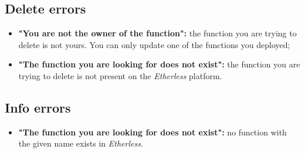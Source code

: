   \subsection{Delete errors}
  \begin{itemize}
    \item \textbf{"You are not the owner of the function":} the function you are trying to delete is not yours. You can only update one of the functions you deployed;
    \item \textbf{"The function you are looking for does not exist":} the function you are trying to delete is not present on the \textit{Etherless} platform.
  \end{itemize}
  \subsection{Info errors}
  \begin{itemize}
    \item \textbf{"The function you are looking for does not exist":} no function with the given name exists in \textit{Etherless}.
  \end{itemize}
